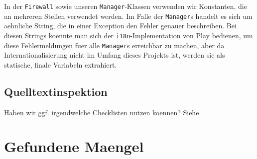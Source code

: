 \documentclass[12pt,DIV14,BCOR10mm,a4paper,twoside,parskip=half-,headsepline,headinclude,english,ngerman,bibliography=totocnumbered]{scrreprt}
\begin{document}
In der \texttt{Firewall} sowie unseren \texttt{Manager}-Klassen verwenden wir Konstanten, die an mehreren Stellen verwendet werden.
Im Falle der \texttt{Manager}s handelt es sich um aehnliche String, die in einer Exception den Fehler genauer beschreiben.
Bei diesen Strings koennte man sich der \texttt{i18n}-Implementation von Play bedienen, um diese Fehlermeldungen fuer alle \texttt{Manager}s erreichbar zu machen, aber da Internationalisierung nicht im Umfang dieses Projekts ist, werden sie als statische, finale Variabeln extrahiert.

\section{Quelltextinspektion}

Haben wir ggf. irgendwelche Checklisten nutzen koennen?
Siehe

\chapter{Gefundene Maengel}

\printbibliography

\printacronyms[title=Abkürzungsverzeichnis,toctitle=Abkürzungsverzeichnis]
\printglossary[type=main]

\listoffigures      %

\end{document}
